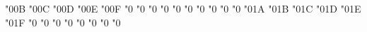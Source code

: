 \mathchardef \upalpha   "0\txmiafam 0B
\mathchardef \upbeta   "0\txmiafam 0C
\mathchardef \upgamma   "0\txmiafam 0D
\mathchardef \updelta   "0\txmiafam 0E
\mathchardef \upepsilon   "0\txmiafam 0F
\mathchardef \upzeta   "0
\mathchardef \upeta   "0
\mathchardef \uptheta   "0
\mathchardef \upiota   "0
\mathchardef \upkappa   "0
\mathchardef \uplambda   "0
\mathchardef \upmu   "0
\mathchardef \upnu   "0
\mathchardef \upxi   "0
\mathchardef \uppi   "0
\mathchardef \uprho   "0\txmiafam 1A
\mathchardef \upsigma   "0\txmiafam 1B
\mathchardef \uptau   "0\txmiafam 1C
\mathchardef \upupsilon   "0\txmiafam 1D
\mathchardef \upphi   "0\txmiafam 1E
\mathchardef \upchi   "0\txmiafam 1F
\mathchardef \uppsi   "0
\mathchardef \upomega   "0
\mathchardef \upvarepsilon   "0
\mathchardef \upvartheta   "0
\mathchardef \upvarpi   "0
\mathchardef \upvarrho   "0
\mathchardef \upvarsigma   "0
\mathchardef \upvarphi   "0


\def\joinrel{\mathrel{\mkern-2.5mu}}  %

\let\circledplus\oplus
\let\circledminus\ominus
\let\circledtimes\otimes
\let\circledslash\oslash
\let\circleddot\odot


\def\downbracefill{$\mathsurround0pt
   \braceld\mkern-1mu
   \cleaders\hbox{$\mkern-.5mu\braacext\mkern-.5mu$}\hfill
   \mkern-1mu\braceru\bracelu\mkern-1mu
   \cleaders\hbox{$\mkern-.5mu\braacext\mkern-.5mu$}\hfill
   \mkern-1mu\bracerd$}

\def\upbracefill{$\mathsurround0pt
   \bracelu\mkern-1mu
   \cleaders\hbox{$\mkern-.5mu\braacext\mkern-.5mu$}\hfill
   \mkern-1mu\bracerd\braceld\mkern-1mu
   \cleaders\hbox{$\mkern-.5mu\braacext\mkern-.5mu$}\hfill
   \mkern-1mu\braceru$}


\def\scalebig#1#2{{\left#1\vbox to#2\fontdimen6\textfont3{}%
                   \kern-\nulldelimiterspace\right.}}
\def\big#1{\scalebig{#1}{.85}}  
\def\Big#1{\scalebig{#1}{1.15}} 
\def\bigg#1{\scalebig{#1}{1.45}}
\def\Bigg#1{\scalebig{#1}{1.75}}


